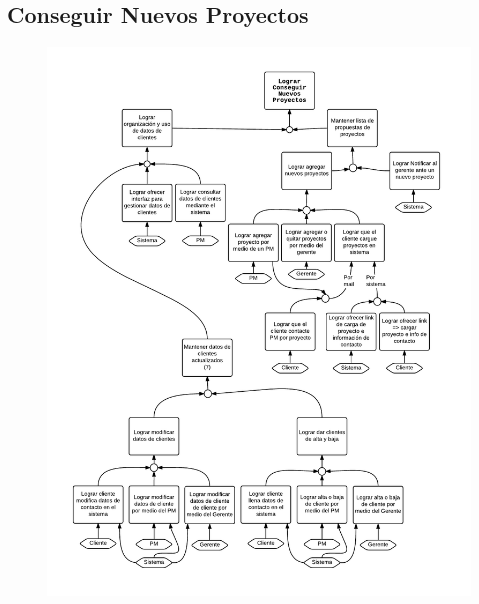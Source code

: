 \subsection{Conseguir Nuevos Proyectos}
\begin{figure}[H]
\includegraphics[width=\textwidth, clip=true, trim=15pt 20pt 15pt 20pt]{imagenes/objetivos/objetivos15.pdf}
\end{figure}
